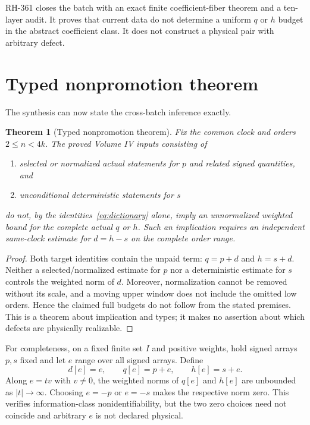 \documentclass[11pt]{article}
\newtheorem{theorem}{Theorem}[section]
\theoremstyle{definition}
\theoremstyle{remark}
\begin{document}
RH-361 closes the batch with an exact finite coefficient-fiber theorem and a
ten-layer audit.  It proves that current data do not determine a uniform
$q$ or $h$ budget in the abstract coefficient class.  It does not construct
a physical pair with arbitrary defect.

\section{Typed nonpromotion theorem}

The synthesis can now state the cross-batch inference exactly.

\begin{theorem}[Typed nonpromotion theorem]\label{thm:nonpromotion}
Fix the common clock and orders $2\le n<4k$.  The proved Volume IV inputs
consisting of
\begin{enumerate}[label=(\roman*)]
\item selected or normalized actual statements for $p$ and related signed
quantities, and
\item unconditional deterministic statements for $s$
\end{enumerate}
do not, by the identities~\eqref{eq:dictionary} alone, imply an unnormalized
weighted bound for the complete actual $q$ or $h$.  Such an implication
requires an independent same-clock estimate for $d=h-s$ on the complete
order range.
\end{theorem}
\begin{proof}
Both target identities contain the unpaid term:
$q=p+d$ and $h=s+d$.  Neither a selected/normalized estimate for $p$ nor a
deterministic estimate for $s$ controls the weighted norm of $d$.  Moreover,
normalization cannot be removed without its scale, and a moving upper window
does not include the omitted low orders.  Hence the claimed full budgets do
not follow from the stated premises.  This is a theorem about implication
and types; it makes no assertion about which defects are physically
realizable.
\end{proof}

For completeness, on a fixed finite set $I$ and positive weights, hold signed
arrays $p,s$ fixed and let $e$ range over all signed arrays.  Define
\[
 d[e]=e,\qquad q[e]=p+e,\qquad h[e]=s+e.
\]
Along $e=tv$ with $v\ne0$, the weighted norms of $q[e]$ and $h[e]$ are
unbounded as $|t|\to\infty$.  Choosing $e=-p$ or $e=-s$ makes the respective
norm zero.  This verifies information-class nonidentifiability, but the two
zero choices need not coincide and arbitrary $e$ is not declared physical.
\end{document}
